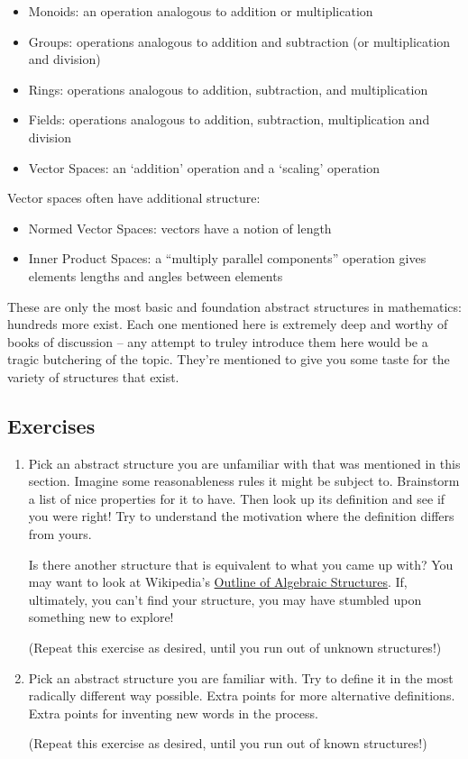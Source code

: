 \documentclass{report}
\begin{document}
\begin{itemize}
\item Monoids: an operation analogous to addition or multiplication
\item Groups: operations analogous to addition and subtraction (or multiplication and division)
\item Rings: operations analogous to addition, subtraction, and multiplication
\item Fields: operations analogous to addition, subtraction, multiplication and division
\item Vector Spaces: an `addition' operation and a `scaling' operation
\end{itemize}

Vector spaces often have additional structure:

\begin{itemize}
\item Normed Vector Spaces: vectors have a notion of length
\item Inner Product Spaces: a ``multiply parallel components'' operation gives elements lengths and angles between elements
\end{itemize}

These are only the most basic and foundation abstract structures in mathematics: hundreds more exist. Each one mentioned here is extremely deep and worthy of books of discussion -- any attempt to truley introduce them here would be a tragic butchering of the topic. They're mentioned to give you some taste for the variety of structures that exist. 

\subsection*{Exercises}

\begin{enumerate}

\item Pick an abstract structure you are unfamiliar with that was mentioned in this section. Imagine some reasonableness rules it might be subject to. Brainstorm a list of nice properties for it to have. Then look up its definition and see if you were right! Try to understand the motivation where the definition differs from yours. 

Is there another structure that is equivalent to what you came up with? You may want to look at Wikipedia's \href{http://en.wikipedia.org/wiki/Outline_of_algebraic_structures}{Outline of Algebraic Structures}. If, ultimately, you can't find your structure, you may have stumbled upon something new to explore!

(Repeat this exercise as desired, until you run out of unknown structures!)

\item Pick an abstract structure you are familiar with. Try to define it in the most radically different way possible. Extra points for more alternative definitions. Extra points for inventing new words in the process.

(Repeat this exercise as desired, until you run out of known structures!)

\end{enumerate}
\end{document}
